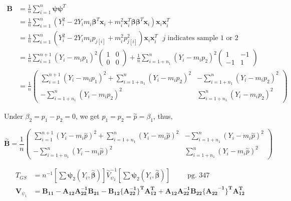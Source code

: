 \documentclass[
  letterpaper,
  DIV=11,
  numbers=noendperiod]{scrreprt}
\begin{document}
\[\begin{aligned}
\mathbf B &= \frac 1 n \sum_{i=1}^n \boldsymbol \psi \boldsymbol \psi^T \\
&= \frac 1 n \sum_{i=1}^n (Y_i^2 -2Y_i m_i  \boldsymbol \beta^T\mathbf x_i + m_i^2 \mathbf x_i^T \boldsymbol \beta \boldsymbol \beta^T\mathbf x_i)\mathbf x_i \mathbf x_i^T \\
&= \frac 1 n \sum_{i=1}^n (Y_i^2 -2Y_i m_i p_{j[i]} + m_i^2 p_{j[i]}^2)\mathbf x_i \mathbf x_i^T ~~~ j \text{ indicates sample 1 or 2}\\
&= \frac 1 n \sum_{i=1}^{n+1} (Y_i - m_i p_1)^2 \begin{pmatrix} 1 & 0 \\ 0 & 0 \end{pmatrix} + \frac 1 n \sum_{i=1+n_1}^{n} (Y_i - m_i p_2)^2 \begin{pmatrix} 1 & -1 \\ -1 & 1 \end{pmatrix}\\
&= \frac 1 n \begin{pmatrix} \sum_{i=1}^{n+1} (Y_i - m_i p_1)^2+  \sum_{i=1+n_1}^{n} (Y_i - m_i p_2)^2&
- \sum_{i=1+n_1}^{n} (Y_i - m_i p_2)^2 \\ - \sum_{i=1+n_1}^{n} (Y_i - m_i p_2)^2 &  \sum_{i=1+n_1}^{n} (Y_i - m_i p_2)^2 \end{pmatrix}
\end{aligned}\]

Under \(\beta_2 = p_1- p_2 =0\), we get
\(p_1 = p_2 = \overset \sim p= \beta_1\), thus,

\[\overset \sim {\mathbf B} = \frac 1 n \begin{pmatrix} \sum_{i=1}^{n+1} (Y_i - m_i \overset \sim p )^2+  \sum_{i=1+n_1}^{n} (Y_i - m_i \overset \sim p )^2&
- \sum_{i=1+n_1}^{n} (Y_i - m_i \overset \sim p )^2 \\ - \sum_{i=1+n_1}^{n} (Y_i - m_i \overset \sim p )^2 &  \sum_{i=1+n_1}^{n} (Y_i - m_i \overset \sim p )^2 \end{pmatrix}\]

\[\begin{aligned}
T_{GS} &= n^{-1} \left[\sum \boldsymbol \psi_2(Y_i, \overset \sim {\boldsymbol \beta}) \right] \overset \sim V_{\psi_2}^{-1} \left[\sum \boldsymbol \psi_2(Y_i, \overset \sim {\boldsymbol \beta}) \right]  ~~~~~~~~~~~ \text{pg. 347 }\\
\mathbf V_{\psi_1} &= \mathbf{B_{11} - A_{12}A_{22}^{-1}B_{21}- B_{12}\{A_{22}^{-1}\}^TA_{12}^T+A_{12}A_{22}^{-1}B_{22}{\{A_{22}}^{-1}\}^TA_{12}^T}
\end{aligned}\]
\end{document}
